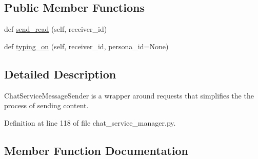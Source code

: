 \subsection*{Public Member Functions}
\begin{DoxyCompactItemize}
\item 
def \hyperlink{classparlai_1_1chat__service_1_1core_1_1chat__service__manager_1_1ChatServiceManager_1_1ChatServiceMessageSender_ad3afa9b59aa1bf4730a392e2e8257d4a}{send\+\_\+read} (self, receiver\+\_\+id)
\item 
def \hyperlink{classparlai_1_1chat__service_1_1core_1_1chat__service__manager_1_1ChatServiceManager_1_1ChatServiceMessageSender_a54162f1c14b3015386dd22a102269a5a}{typing\+\_\+on} (self, receiver\+\_\+id, persona\+\_\+id=None)
\end{DoxyCompactItemize}


\subsection{Detailed Description}
\begin{DoxyVerb}ChatServiceMessageSender is a wrapper around requests that simplifies the the
process of sending content.
\end{DoxyVerb}
 

Definition at line 118 of file chat\+\_\+service\+\_\+manager.\+py.



\subsection{Member Function Documentation}
\mbox{\label{classparlai_1_1chat__service_1_1core_1_1chat__service__manager_1_1ChatServiceManager_1_1ChatServiceMessageSender_ad3afa9b59aa1bf4730a392e2e8257d4a}} 
